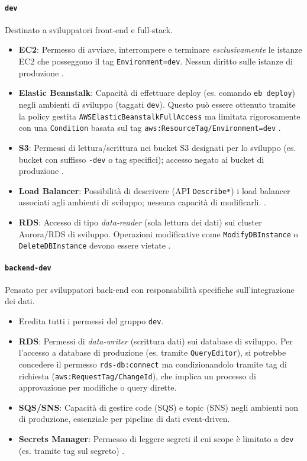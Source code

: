 \paragraph{\texttt{dev}}%
Destinato a sviluppatori front‑end e full‑stack.  
\begin{itemize}
  \item \textbf{EC2}: Permesso di avviare, interrompere e terminare \emph{esclusivamente} le istanze EC2 che posseggono il tag \texttt{Environment=dev}. Nessun diritto sulle istanze di produzione \cite{AWSEC2IAM}.  
  \item \textbf{Elastic Beanstalk}: Capacità di effettuare deploy (es. comando \texttt{eb deploy}) negli ambienti di sviluppo (taggati \texttt{dev}). Questo può essere ottenuto tramite la policy gestita \texttt{AWSElasticBeanstalkFullAccess} ma limitata rigorosamente con una \texttt{Condition} basata sul tag \texttt{aws:ResourceTag/Environment=dev} \cite{AWSEBRole}.  
  \item \textbf{S3}: Permessi di lettura/scrittura nei bucket S3 designati per lo sviluppo (es. bucket con suffisso \texttt{-dev} o tag specifici); accesso negato ai bucket di produzione \cite{AWSS3Security}.  
  \item \textbf{Load Balancer}: Possibilità di descrivere (API \texttt{Describe*}) i load balancer associati agli ambienti di sviluppo; nessuna capacità di modificarli. \cite{AWSELBIAM}.  
  \item \textbf{RDS}: Accesso di tipo \emph{data‑reader} (sola lettura dei dati) sui cluster Aurora/RDS di sviluppo. Operazioni modificative come \texttt{ModifyDBInstance} o \texttt{DeleteDBInstance} devono essere vietate \cite{AWSRDSIAM}.  
\end{itemize}

\paragraph{\texttt{backend‑dev}}%
Pensato per sviluppatori back‑end con responsabilità specifiche sull'integrazione dei dati.  
\begin{itemize}
  \item Eredita tutti i permessi del gruppo \texttt{dev}.  
  \item \textbf{RDS}: Permessi di \emph{data‑writer} (scrittura dati) sui database di sviluppo. Per l'accesso a database di produzione (es. tramite \texttt{QueryEditor}), si potrebbe concedere il permesso \texttt{rds-db:connect} ma condizionandolo tramite tag di richiesta (\texttt{aws:RequestTag/ChangeId}), che implica un processo di approvazione per modifiche o query dirette.  
  \item \textbf{SQS/SNS}: Capacità di gestire code (SQS) e topic (SNS) negli ambienti non di produzione, essenziale per pipeline di dati event‑driven.  
  \item \textbf{Secrets Manager}: Permesso di leggere segreti il cui scope è limitato a \texttt{dev} (es. tramite tag sul segreto) \cite{AWSIAMBestPractices}.  
\end{itemize}

